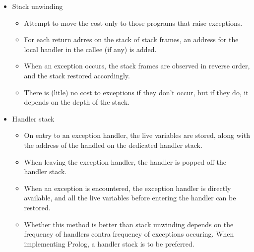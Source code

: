 \begin{itemize}
\item Stack unwinding

\begin{itemize}

\item Attempt to move the cost only to those programs that raise exceptions.

\item For each return adrres on the stack of stack frames, an address for the
local handler in the callee (if any) is added.

\item When an exception occurs, the stack frames are observed in reverse order,
and the stack restored accordingly.

\item There is (litle) no cost to exceptions if they don't occur, but if they
do, it depends on the depth of the stack.

\end{itemize}

\item Handler stack

\begin{itemize}

\item On entry to an exception handler, the live variables are stored, along
with the address of the handled on the dedicated handler stack.

\item When leaving the exception handler, the handler is popped off the handler
stack.

\item When an exception is encountered, the exception handler is directly
available, and all the live variables before entering the handler can be
restored.

\item Whether this method is better than stack unwinding depends on the
frequency of handlers contra frequency of exceptions occuring. When
implementing Prolog, a handler stack is to be preferred.

\end{itemize}

\end{itemize}
